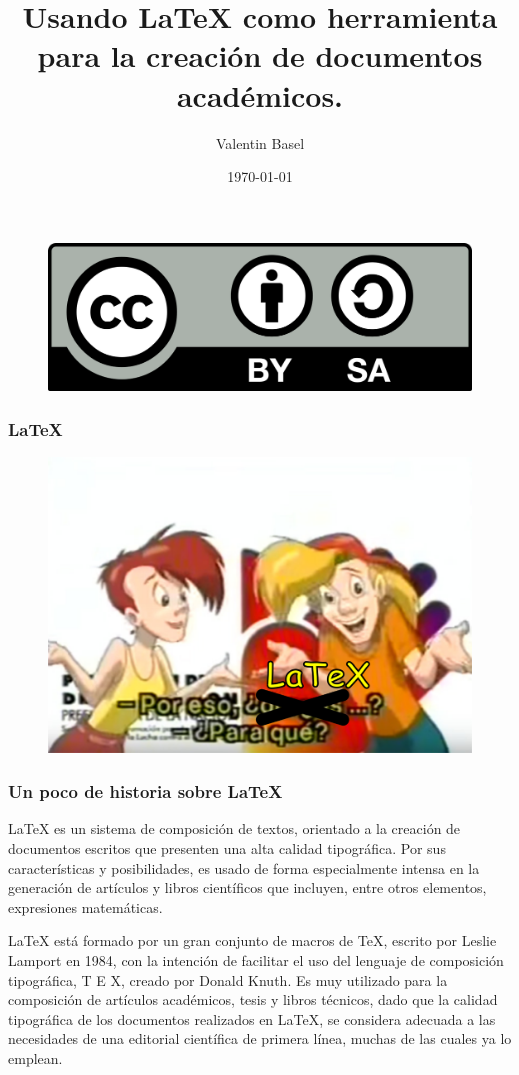 \documentclass{beamer}
\title[\LaTeX{}... ¿para que?]{Usando \LaTeX{} como herramienta para la creación de documentos académicos.} %
\author{Valentin Basel} %
\institute[CIECS-UNC-CONICET] %
{
Universidad Nacional de Córdoba \\ %
\medskip
\textit{valentinbasel@gmail.com} %
}
\date{\today} %
\begin{document}
\begin{frame}
  \titlepage %
    \begin{figure}
    \includegraphics[width=0.4\linewidth]{img/bysa.png}
  \end{figure}
\end{frame}

\begin{frame}
\frametitle{\LaTeX{}}

  \begin{figure}
    \includegraphics[width=0.8\linewidth]{img/fleco_y_male_latex.png}
  \end{figure}
\end{frame}

\begin{frame}
  \frametitle{Un poco de historia sobre \LaTeX{}}

\LaTeX{} es un sistema de composición de textos, orientado a la creación de documentos escritos que presenten una alta calidad tipográfica. Por sus características y posibilidades, es usado de forma especialmente intensa en la generación de artículos y libros científicos que incluyen, entre otros elementos, expresiones matemáticas.

\LaTeX{} está formado por un gran conjunto de macros de TeX, escrito por Leslie Lamport en 1984, con la intención de facilitar el uso del lenguaje de composición tipográfica, T E X, creado por Donald Knuth. Es muy utilizado para la composición de artículos académicos, tesis y libros técnicos, dado que la calidad tipográfica de los documentos realizados en LaTeX, se considera adecuada a las necesidades de una editorial científica de primera línea, muchas de las cuales ya lo emplean. 

\end{frame}
\end{document}
